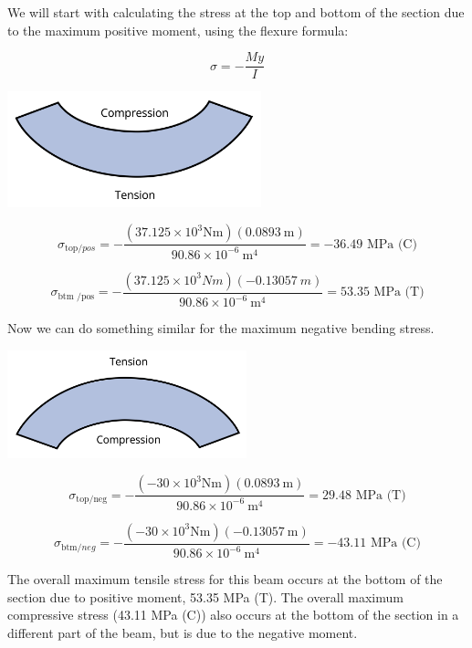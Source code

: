 \documentclass[
  letterpaper,
  DIV=11,
  numbers=noendperiod]{scrreprt}
\begin{document}
\begin{tcolorbox}
We will start with calculating the stress at the top and bottom of the
section due to the maximum positive moment, using the flexure formula:

\[
\sigma=-\frac{M y}{I}
\]

\begin{center}
\includegraphics[width=2.89583in,height=\textheight]{images/CH9 PNGs/Example 9.2 part 6.png}
\end{center}

\[
\sigma_{\text{top}/pos}=-\frac{\left(37.125 \times 10^3 \mathrm{Nm}\right)(0.0893 \mathrm{~m})}{90.86 \times 10^{-6} \mathrm{~m}^4}=-36.49 \text{ MPa (C)}
\]

\[
\sigma_{\text{btm }/\text{pos}}=-\frac{\left(37.125\times10^3{Nm}\right)(-0.13057{~m})}{90.86 \times 10^{-6} \mathrm{~m}^4}=53.35 \text{ MPa}\text{ (T)}
\]

Now we can do something similar for the maximum negative bending stress.

\begin{center}
\includegraphics[width=2.72917in,height=\textheight]{images/CH9 PNGs/Example 9.2 part 7.png}
\end{center}

\[
\sigma_{\text{top}/\text{neg}}=-\frac{\left(-30 \times 10^3 \mathrm{Nm}\right)(0.0893 \mathrm{~m})}{90.86 \times 10^{-6} \mathrm{~m}^4}=29.48 \text{ MPa (T)}
\]

\[
\sigma_{\text{btm}/neg}=-\frac{\left(-30 \times 10^3 \mathrm{Nm}\right)(-0.13057\mathrm{~m})}{90.86 \times 10^{-6} \mathrm{~m}^4}=-43.11 \text{ MPa}\text{ (C)}
\]

The overall maximum tensile stress for this beam occurs at the bottom of
the section due to positive moment, 53.35 MPa (T). The overall maximum
compressive stress (43.11 MPa (C)) also occurs at the bottom of the
section in a different part of the beam, but is due to the negative
moment.

\end{tcolorbox}
\end{document}
